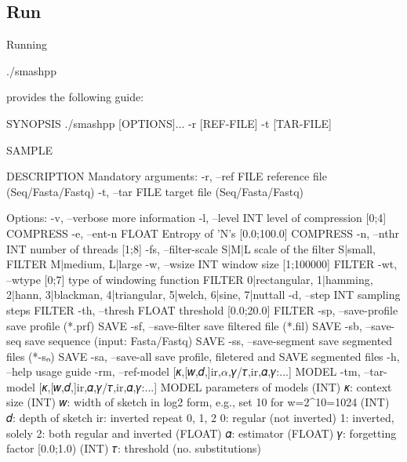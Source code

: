 \subsection{Run}
Running
\begin{code}[style=bash]
./smashpp
\end{code}
provides the following guide:
\begin{code}[style=bash]
SYNOPSIS
  ./smashpp [OPTIONS]...  -r [REF-FILE] -t [TAR-FILE]

SAMPLE

DESCRIPTION
  Mandatory arguments:
  -r,  --ref FILE            reference file (Seq/Fasta/Fastq)
  -t,  --tar FILE            target file    (Seq/Fasta/Fastq)

  Options:
  -v,  --verbose             more information
  -l,  --level INT           level of compression [0;4]     COMPRESS
  -e,  --ent-n FLOAT         Entropy of 'N's [0.0;100.0]    COMPRESS
  -n,  --nthr  INT           number of threads [1;8]
  -fs, --filter-scale S|M|L  scale of the filter {S|small,    FILTER
                             M|medium, L|large}
  -w,  --wsize INT           window size [1;100000]           FILTER
  -wt, --wtype [0;7]         type of windowing function       FILTER
                             {0|rectangular, 1|hamming, 2|hann,
                             3|blackman, 4|triangular, 5|welch,
                             6|sine, 7|nuttall}
  -d,  --step   INT          sampling steps                   FILTER
  -th, --thresh FLOAT        threshold [0.0;20.0]             FILTER
  -sp, --save-profile        save profile (*.prf)               SAVE
  -sf, --save-filter         save filtered file (*.fil)         SAVE
  -sb, --save-seq            save sequence (input: Fasta/Fastq) SAVE
  -ss, --save-segment        save segmented files (*-sₙ)        SAVE
  -sa, --save-all            save profile, filetered and        SAVE
                             segmented files
  -h,  --help                usage guide 
  -rm, --ref-model [𝜅,[𝑤,𝑑,]ir,$\alpha$,𝛾/𝜏,ir,𝛼,𝛾:...]               MODEL
  -tm, --tar-model [𝜅,[𝑤,𝑑,]ir,𝛼,𝛾/𝜏,ir,𝛼,𝛾:...]               MODEL
                             parameters of models
                       (INT) 𝜅:  context size 
                       (INT) 𝑤:  width of sketch in log2 form, 
                                 e.g., set 10 for w=2^10=1024
                       (INT) 𝑑:  depth of sketch
                             ir: inverted repeat {0, 1, 2}
                                 0: regular (not inverted)
                                 1: inverted, solely
                                 2: both regular and inverted
                     (FLOAT) 𝛼:  estimator
                     (FLOAT) 𝛾:  forgetting factor [0.0;1.0)
                       (INT) 𝜏:  threshold (no. substitutions)
\end{code}

